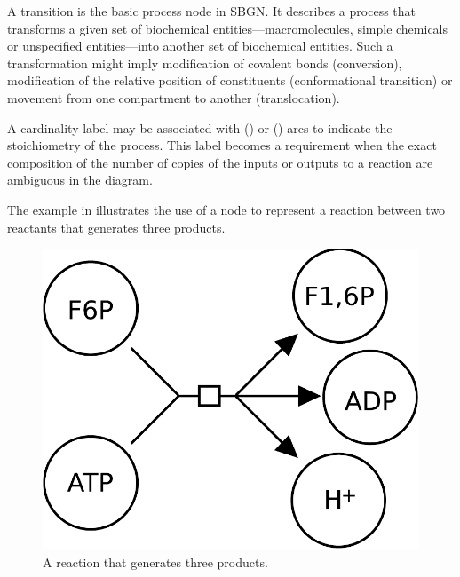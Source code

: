 A transition is the basic process node in SBGN.  It describes a process that transforms a given set of biochemical entities---macromolecules, simple chemicals or unspecified entities---into another set of biochemical entities.  Such a transformation might imply modification of covalent bonds (conversion), modification of the relative position of constituents (conformational transition) or movement from one compartment to another (translocation).

A cardinality label may be associated with  () or  () arcs to indicate the stoichiometry of the process.  This label becomes a requirement when the exact composition of the number of copies of the inputs or outputs to a reaction are ambiguous in the diagram.

The example in  illustrates the use of a  node to represent a reaction between two reactants that generates three products. 

\begin{figure}[H]
  \centering
  \includegraphics[scale = 0.3]{examples/transition-reaction}
  \caption{A reaction that generates three products.}
  \label{fig:trans-react}
\end{figure}
 
%
% 

\normalcolor

